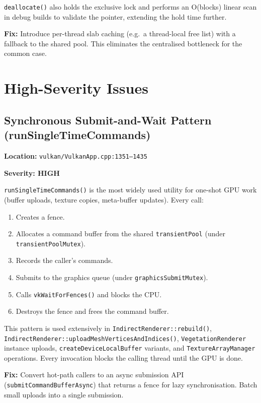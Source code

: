 \documentclass[a4paper,11pt]{article}
\begin{document}
\texttt{deallocate()} also holds the exclusive lock and performs an
O(blocks) linear scan in debug builds to validate the pointer, extending the
hold time further.

\textbf{Fix:} Introduce per-thread slab caching (e.g.\ a thread-local free
list) with a fallback to the shared pool. This eliminates the centralised
bottleneck for the common case.

\section{High-Severity Issues}

\subsection{Synchronous Submit-and-Wait Pattern (runSingleTimeCommands)}

\textbf{Location:} \texttt{vulkan/VulkanApp.cpp:1351--1435}

\textbf{Severity: HIGH}

\texttt{runSingleTime\-Commands()} is the most widely used utility for
one-shot GPU work (buffer uploads, texture copies, meta-buffer updates).
Every call:
\begin{enumerate}
\item Creates a fence.
\item Allocates a command buffer from the shared \texttt{transientPool}
      (under \texttt{transientPoolMutex}).
\item Records the caller's commands.
\item Submits to the graphics queue (under \texttt{graphicsSubmitMutex}).
\item Calls \texttt{vkWaitForFences()} and blocks the CPU.
\item Destroys the fence and frees the command buffer.
\end{enumerate}

This pattern is used extensively in \texttt{IndirectRenderer::rebuild()},
\texttt{IndirectRenderer::upload\-Mesh\-VerticesAndIndices()},
\texttt{VegetationRenderer} instance uploads, \texttt{createDeviceLocalBuffer}
variants, and \texttt{TextureArray\-Manager} operations. Every invocation
blocks the calling thread until the GPU is done.

\textbf{Fix:} Convert hot-path callers to an async submission API
(\texttt{submit\-Command\-BufferAsync}) that returns a fence for lazy
synchronisation. Batch small uploads into a single submission.
\end{document}
